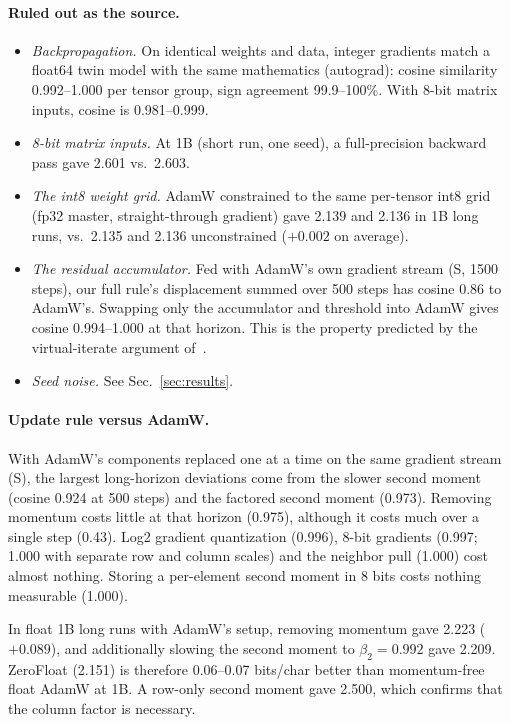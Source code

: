 \documentclass[11pt]{article}
\begin{document}
\paragraph{Ruled out as the source.}
\begin{itemize}
\item \emph{Backpropagation.} On identical weights and data, integer gradients match a float64 twin model with the same mathematics (autograd): cosine similarity 0.992--1.000 per tensor group, sign agreement 99.9--100\%. With 8-bit matrix inputs, cosine is 0.981--0.999.
\item \emph{8-bit matrix inputs.} At 1B (short run, one seed), a full-precision backward pass gave 2.601 vs.\ 2.603.
\item \emph{The int8 weight grid.} AdamW constrained to the same per-tensor int8 grid (fp32 master, straight-through gradient) gave 2.139 and 2.136 in 1B long runs, vs.\ 2.135 and 2.136 unconstrained ($+0.002$ on average).
\item \emph{The residual accumulator.} Fed with AdamW's own gradient stream (S, 1500 steps), our full rule's displacement summed over 500 steps has cosine 0.86 to AdamW's. Swapping only the accumulator and threshold into AdamW gives cosine 0.994--1.000 at that horizon. This is the property predicted by the virtual-iterate argument of~\cite{kafes}.
\item \emph{Seed noise.} See Sec.~\ref{sec:results}.
\end{itemize}

\paragraph{Update rule versus AdamW.} With AdamW's components replaced one at a time on the same gradient stream (S), the largest long-horizon deviations come from the slower second moment (cosine 0.924 at 500 steps) and the factored second moment (0.973). Removing momentum costs little at that horizon (0.975), although it costs much over a single step (0.43). Log2 gradient quantization (0.996), 8-bit gradients (0.997; 1.000 with separate row and column scales) and the neighbor pull (1.000) cost almost nothing. Storing a per-element second moment in 8 bits costs nothing measurable (1.000).

In float 1B long runs with AdamW's setup, removing momentum gave 2.223 ($+0.089$), and additionally slowing the second moment to $\beta_2=0.992$ gave 2.209. ZeroFloat (2.151) is therefore 0.06--0.07 bits/char better than momentum-free float AdamW at 1B. A row-only second moment gave 2.500, which confirms that the column factor is necessary.
\end{document}
